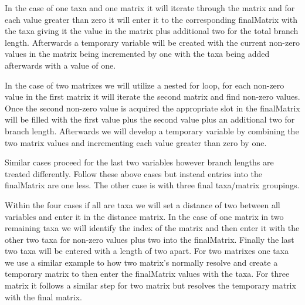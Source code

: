\documentclass{article}
\begin{document}
In the case of one taxa and one matrix it will iterate through the matrix and for each value greater than zero it will enter it to the corresponding finalMatrix with the taxa giving it the value in the matrix plus additional two for the total branch length. Afterwards a temporary variable will be created with the current non-zero values in the matrix being incremented by one with the taxa being added afterwards with a value of one.

In the case of two matrixes we will utilize a nested for loop, for each non-zero value in the first matrix it will iterate the second matrix and find non-zero values. Once the second non-zero value is acquired the appropriate slot in the finalMatrix will be filled with the first value plus the second value plus an additional two for branch length. Afterwards we will develop a temporary variable by combining the two matrix values and incrementing each value greater than zero by one.

Similar cases proceed for the last two variables however branch lengths are treated differently. Follow these above cases but instead entries into the finalMatrix are one less. The other case is with three final taxa/matrix groupings. 

Within the four cases if all are taxa we will set a distance of two between all variables and enter it in the distance matrix. In the case of one matrix in two remaining taxa we will identify the index of the matrix and then enter it with the other two taxa for non-zero values plus two into the finalMatrix. Finally the last two taxa will be entered with a length of two apart. For two matrixes one taxa we use a similar example to how two matrix’s normally resolve and create a temporary matrix to then enter the finalMatrix values with the taxa. For three matrix it follows a similar step for two matrix but resolves the temporary matrix with the final matrix. 
\end{document}
